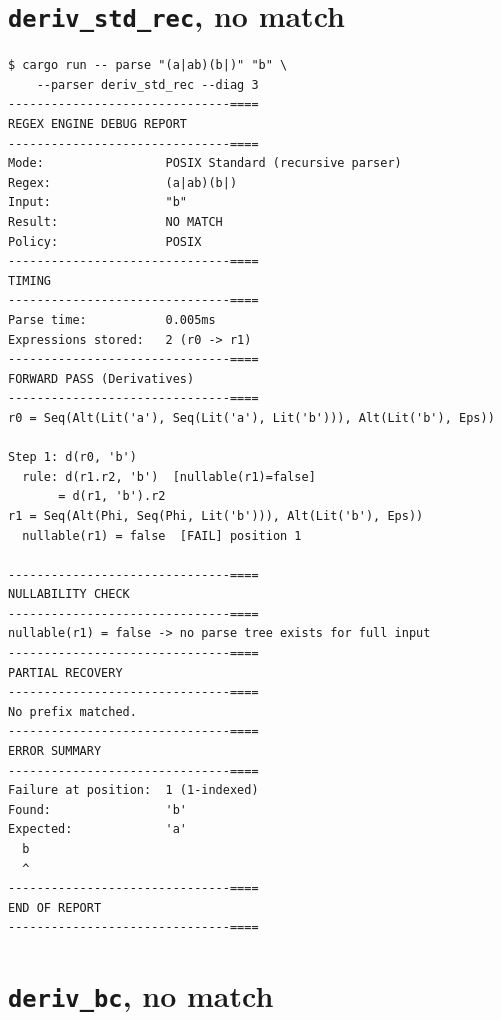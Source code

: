 \section{\texttt{deriv\_std\_rec}, no match}
\label{app:report-deriv-std-nomatch}

\begin{verbatim}
$ cargo run -- parse "(a|ab)(b|)" "b" \
    --parser deriv_std_rec --diag 3
-------------------------------====
REGEX ENGINE DEBUG REPORT
-------------------------------====
Mode:                 POSIX Standard (recursive parser)
Regex:                (a|ab)(b|)
Input:                "b"
Result:               NO MATCH
Policy:               POSIX
-------------------------------====
TIMING
-------------------------------====
Parse time:           0.005ms
Expressions stored:   2 (r0 -> r1)
-------------------------------====
FORWARD PASS (Derivatives)
-------------------------------====
r0 = Seq(Alt(Lit('a'), Seq(Lit('a'), Lit('b'))), Alt(Lit('b'), Eps))

Step 1: d(r0, 'b')
  rule: d(r1.r2, 'b')  [nullable(r1)=false]
       = d(r1, 'b').r2
r1 = Seq(Alt(Phi, Seq(Phi, Lit('b'))), Alt(Lit('b'), Eps))
  nullable(r1) = false  [FAIL] position 1

-------------------------------====
NULLABILITY CHECK
-------------------------------====
nullable(r1) = false -> no parse tree exists for full input
-------------------------------====
PARTIAL RECOVERY
-------------------------------====
No prefix matched.
-------------------------------====
ERROR SUMMARY
-------------------------------====
Failure at position:  1 (1-indexed)
Found:                'b'
Expected:             'a'
  b
  ^
-------------------------------====
END OF REPORT
-------------------------------====
\end{verbatim}

\section{\texttt{deriv\_bc}, no match}
\label{app:report-deriv-bc-nomatch}

